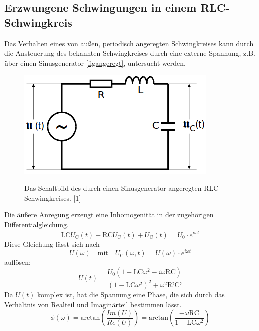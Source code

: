 \documentclass[titlepage = firstcover]{scrartcl}
\begin{document}
        \subsection{Erzwungene Schwingungen in einem RLC-Schwingkreis}
            Das Verhalten eines von außen, periodisch angeregten Schwingkreises kann durch die Ansteuerung des bekannten Schwingkreises durch eine externe Spannung, z.B.
            über einen Sinusgenerator \ref{figangeregt}, untersucht werden. 
            \begin{figure}[h]
                \centering
                \caption{Das Schaltbild des durch einen Sinusgenerator angeregten RLC-Schwingkreises. [1]}
                \includegraphics[width = 0.4\linewidth]{angeregt.png}
                \label{fig:angeregt}
            \end{figure}
            \FloatBarrier
            Die äußere Anregung erzeugt eine Inhomogenität in der zugehörigen Differentialgleichung.
            \begin{equation}
                \text{LC}\ddot{U}_{\text{C}}(t) + \text{RC} \dot{U_{\text{C}}(t)} + U_{\text{C}}(t) = U_0 \cdot e^{i\omega t}
                \label{eqn:angeregt}
            \end{equation}
            Diese Gleichung lässt sich nach 
            \begin{equation*}
                U(\omega) \quad \text{mit} \quad U_\text{C}(\omega,t) = U(\omega) \cdot e^{i\omega t}
            \end{equation*}
            auflösen:
            \begin{equation}
                U(t) = \frac{U_0 (1-\text{LC}\omega^2-i\omega \text{RC})}{(1-\text{LC}\omega^2)^2 + \omega^2\text{R²C²}}
                \label{eqn:Uangeregt}
            \end{equation}
            Da $U(t)$ komplex ist, hat die Spannung eine Phase, die sich durch das Verhältnis von Realteil und Imaginärteil bestimmen lässt.
            \begin{equation}
                \phi (\omega) = \text{arctan}\left(\frac{Im(U)}{Re(U)}\right) = \text{arctan}\left(\frac{-\omega \text{RC}}{1-\text{LC}\omega^2}\right)
                \label{eqn:Phase}
            \end{equation}
\end{document}
